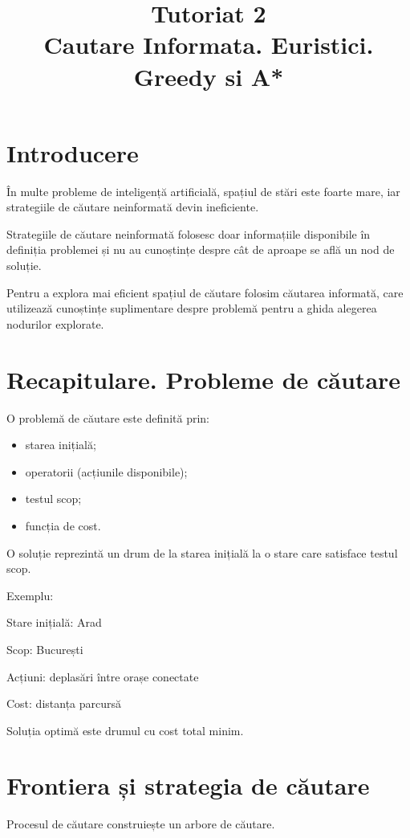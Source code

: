 \documentclass[12pt,a4paper]{article}
\title{Tutoriat 2\\Cautare Informata. Euristici. Greedy si A*}
\author{}
\date{}
\begin{document}
\maketitle

\section{Introducere}

În multe probleme de inteligență artificială, spațiul de stări este foarte mare, iar strategiile de căutare neinformată devin ineficiente.

Strategiile de căutare neinformată folosesc doar informațiile disponibile în definiția problemei și nu au cunoștințe despre cât de aproape se află un nod de soluție.

Pentru a explora mai eficient spațiul de căutare folosim căutarea informată, care utilizează cunoștințe suplimentare despre problemă pentru a ghida alegerea nodurilor explorate.

\section{Recapitulare. Probleme de căutare}

O problemă de căutare este definită prin:

\begin{itemize}
\item starea inițială;
\item operatorii (acțiunile disponibile);
\item testul scop;
\item funcția de cost.
\end{itemize}

O soluție reprezintă un drum de la starea inițială la o stare care satisface testul scop.

Exemplu:

Stare inițială: Arad

Scop: București

Acțiuni: deplasări între orașe conectate

Cost: distanța parcursă

Soluția optimă este drumul cu cost total minim.

\section{Frontiera și strategia de căutare}

Procesul de căutare construiește un arbore de căutare.
\end{document}
